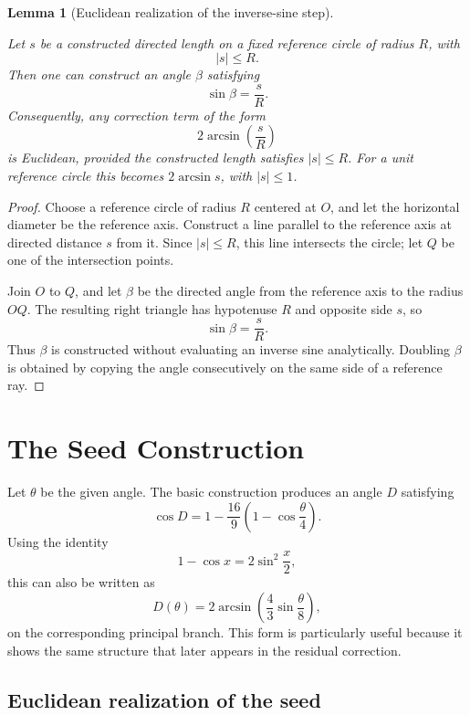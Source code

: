 \documentclass[11pt]{article}
\newtheorem{lemma}{Lemma}
\theoremstyle{remark}
\begin{document}
\begin{lemma}[Euclidean realization of the inverse-sine step]
\label{lem:inverse-sine-euclidean}

Let \(s\) be a constructed directed length on a fixed reference circle of radius \(R\), with
\[
|s|\le R.
\]
Then one can construct an angle \(\beta\) satisfying
\[
\sin\beta=\frac{s}{R}.
\]
Consequently, any correction term of the form
\[
2\arcsin\!\left(\frac{s}{R}\right)
\]
is Euclidean, provided the constructed length satisfies \(|s|\le R\). For a unit reference circle this becomes \(2\arcsin s\), with \(|s|\le 1\).

\end{lemma}

\begin{proof}
Choose a reference circle of radius \(R\) centered at \(O\), and let the horizontal diameter be the reference axis. Construct a line parallel to the reference axis at directed distance \(s\) from it. Since \(|s|\le R\), this line intersects the circle; let \(Q\) be one of the intersection points.

Join \(O\) to \(Q\), and let \(\beta\) be the directed angle from the reference axis to the radius \(OQ\). The resulting right triangle has hypotenuse \(R\) and opposite side \(s\), so
\[
\sin\beta=\frac{s}{R}.
\]
Thus \(\beta\) is constructed without evaluating an inverse sine analytically. Doubling \(\beta\) is obtained by copying the angle consecutively on the same side of a reference ray.
\end{proof}

\section{The Seed Construction}

Let $\theta$ be the given angle.  The basic construction produces an angle $D$ satisfying
\[
\cos D
=
1-\frac{16}{9}\left(1-\cos\frac{\theta}{4}\right).
\]
Using the identity
\[
1-\cos x
=
2\sin^2\frac{x}{2},
\]
this can also be written as
\[
D(\theta)
=
2\arcsin\!\left(
\frac43\sin\frac{\theta}{8}
\right),
\]
on the corresponding principal branch.  This form is particularly useful because it shows
the same structure that later appears in the residual correction.

\subsection{Euclidean realization of the seed}
\end{document}
